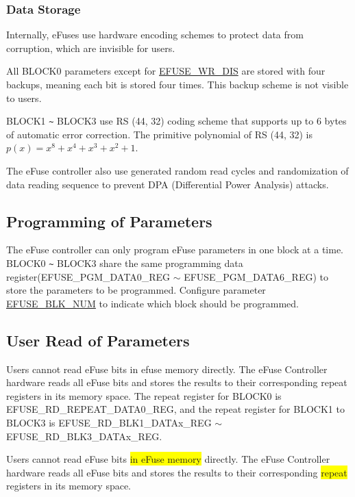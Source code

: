 \documentclass[main\_\_EN.tex]{subfiles}
\begin{document}
\subsubsection{Data Storage}
\label{sec:efuse-data-storage}

Internally, eFuses use hardware encoding schemes to protect data from corruption, which are invisible for users.

All BLOCK0 parameters except for \hyperref[fielddesc:EFUSEWRDIS]{EFUSE\_WR\_DIS} are stored with four backups, meaning each bit is stored four times. This backup scheme is not visible to users.

BLOCK1 \verb+~+ BLOCK3 use RS (44, 32) coding scheme that supports up to 6 bytes of automatic error correction. The primitive polynomial of RS (44, 32) is \(p(x)=x^8+x^4+x^3+x^2+1\).

The eFuse controller also use generated random read cycles and randomization of data reading sequence to prevent DPA (Differential Power Analysis) attacks.



\subsection{Programming of Parameters}
\label{sec:efuse-software-programming-para}

The eFuse controller can only program eFuse parameters in one block at a time. BLOCK0 \verb+~+ BLOCK3 share the same programming data register(EFUSE\_PGM\_DATA0\_REG $\sim$ EFUSE\_PGM\_DATA6\_REG) to store the parameters to be programmed. Configure parameter \hyperref[fielddesc:EFUSEBLKNUM]{EFUSE\_BLK\_NUM} to indicate which block should be programmed.



\subsection{User Read of Parameters}
\label{sec:efuse-software-read-para}

Users cannot read eFuse bits in efuse memory directly. The eFuse Controller hardware reads all eFuse bits and stores the results to their corresponding repeat registers in its memory space. The repeat register for BLOCK0 is EFUSE\_RD\_REPEAT\_DATA0\_REG, and the repeat register for BLOCK1 to BLOCK3 is EFUSE\_RD\_BLK1\_DATAx\_REG  $\sim$ EFUSE\_RD\_BLK3\_DATAx\_REG.


Users cannot read eFuse bits \colorbox{yellow}{in eFuse memory} directly. The eFuse Controller hardware reads all eFuse bits and stores the results to their corresponding \colorbox{yellow}{repeat} registers in its memory space.
\end{document}
